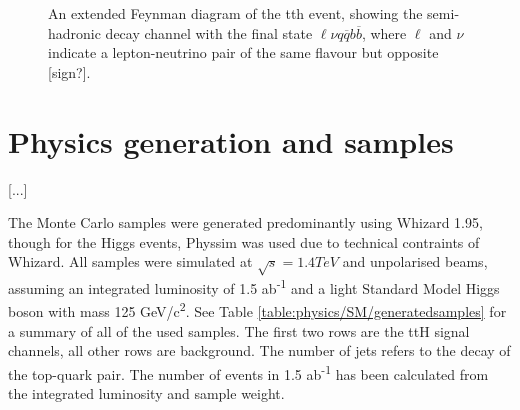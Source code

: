 \begin{figure}
	\caption{An extended Feynman diagram of the tth event, showing the semi-hadronic decay channel  with the final state $\ell\nu q\overline{q}b\overline{b}$, where $\ell$ and $\nu$ indicate a lepton-neutrino pair of the same flavour but opposite [sign?].}
	\label{figure:physics/SM/feynman-tth-semileptonic}
\end{figure}

\section{Physics generation and samples}
[...]

The Monte Carlo samples were generated predominantly using Whizard 1.95, though for the Higgs events, Physsim was used due to technical contraints of Whizard. All samples were simulated at $\sqrt{s} = 1.4TeV$ and unpolarised beams, assuming an integrated luminosity of 1.5 ab\textsuperscript{-1} and a light Standard Model Higgs boson with mass 125 GeV/c\textsuperscript{2}. See Table \ref{table:physics/SM/generatedsamples} for a summary of all of the used samples. The first two rows are the ttH signal channels, all other rows are background. The number of jets refers to the decay of the top-quark pair. The number of events in 1.5 ab\textsuperscript{-1} has been calculated from the integrated luminosity and sample weight.

